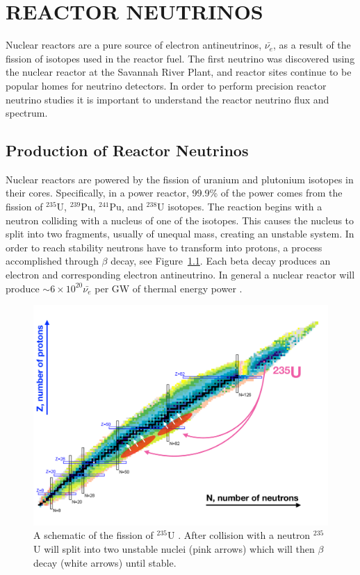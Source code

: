 \chapter{\uppercase{Reactor Neutrinos}}

Nuclear reactors are a pure source of electron antineutrinos, $\bar{\nu_e}$, as a result of the fission of isotopes used in the reactor fuel. The first neutrino was discovered using the nuclear reactor at the Savannah River Plant, and reactor sites continue to be popular homes for neutrino detectors. 
In order to perform precision reactor neutrino studies it is important to understand the reactor neutrino flux and spectrum.

\section{Production of Reactor Neutrinos}

Nuclear reactors are powered by the fission of uranium and plutonium isotopes in their cores. 
Specifically, in a power reactor, 99.9\% of the power comes from the fission of $^{235}$U, $^{239}$Pu, $^{241}$Pu, and $^{238}$U isotopes. 
The reaction begins with a neutron colliding with a nucleus of one of the isotopes. 
This causes the nucleus to split into two fragments, usually of unequal mass, creating an unstable system.
In order to reach stability neutrons have to transform into protons, a process accomplished through $\beta$ decay, see Figure~\ref{fig:nucchart}.
Each beta decay produces an electron and corresponding electron antineutrino. 
In general a nuclear reactor will produce $\sim 6 \times 10^{20} \bar{\nu_e}$ per GW of thermal energy power \cite{HayesVogel}.

\begin{figure}[h]
	\centering
	\includegraphics[width=0.7\linewidth]{tex/3-reactorneutrinos-images/NuclideChart_U235}
	\caption[Fission of $^{235}$U.]{A schematic of the fission of $^{235}$U \cite{NucChart}. After collision with a neutron $^{235}$U will split into two unstable nuclei (pink arrows) which will then $\beta$ decay (white arrows) until stable.}
	\label{fig:nucchart}
\end{figure}


